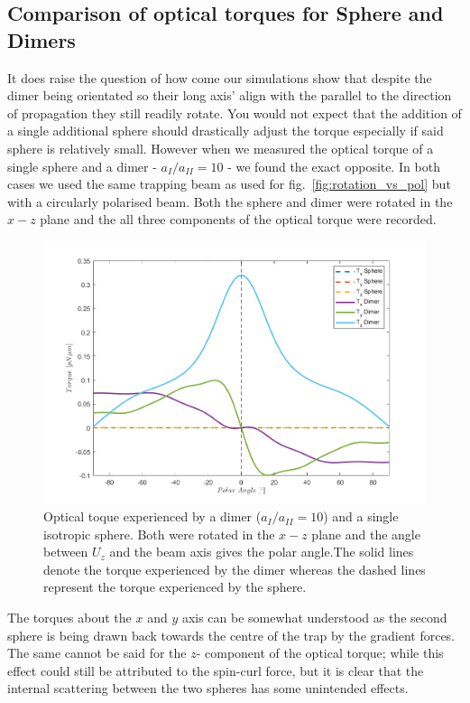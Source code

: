 \subsection{Comparison of optical torques for Sphere and Dimers}
It does raise the question of how come our simulations show that 
despite the dimer being orientated so their long axis' align with 
the parallel to the direction of propagation they still readily 
rotate. You would not expect that the addition of a single additional 
sphere should drastically adjust the torque especially if said sphere 
is relatively small. However when we measured the optical torque 
of a single sphere and a dimer - $a_{I}/a_{II}=10$ - we found the 
exact opposite. In both cases we used the same trapping beam as used 
for fig.~\ref{fig:rotation_vs_pol} but with a circularly polarised 
beam. Both the sphere and dimer were rotated in the $x-z$ plane and 
the all three components of the optical torque were recorded.
\begin{figure}[h!]
	\centering	
	\includegraphics[width=\linewidth]{sphere_dimer_torque.png}
	\caption{Optical toque experienced by a dimer ($a_{I}/a_{II}=10$) and a 
	single isotropic sphere. Both were rotated in the $x-z$ plane and the angle 
	between $U_z$ and the beam axis gives the polar angle.The solid lines denote 
	the torque experienced by the dimer whereas the dashed lines represent the 
	torque experienced by the sphere.}
	\label{fig:sphere_dimer_torque}
\end{figure}
 
The torques about the $x$ and $y$ axis can be somewhat understood 
as the second sphere is being drawn back towards the centre of the 
trap by the gradient forces. The same cannot be said for the $z$-
component of the optical torque; while this effect could still be 
attributed to the spin-curl force, but it is clear that the internal 
scattering between the two spheres has some unintended effects. 

